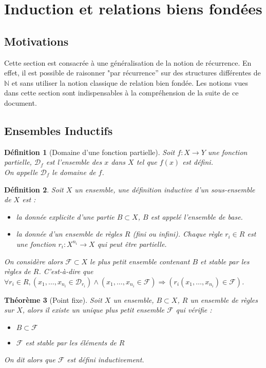 \documentclass[a4paper,12pt]{article}
\theoremstyle{plain}
\newtheorem{theo}{Théorème}[subsection]
\newtheorem{defi}[theo]{Définition}
\begin{document}
\section{Induction et relations biens fondées}
\label{induction et relations biens fondées}

\subsection{Motivations}

Cette section est consacrée à une généralisation de la notion de récurrence. En effet, il est possible de raisonner "par récurrence'' sur des structures différentes de $\mathbb{N}$ et sans utiliser la notion classique de relation bien fondée. Les notions vues dans cette section sont indispensables à la compréhension de la suite de ce document.

\subsection{Ensembles Inductifs}

\begin{defi}[Domaine d'une fonction partielle]
Soit $f : X \to Y$ une fonction partielle, $\mathcal{D}_f$ est l'ensemble des $x$ dans $X$ tel que $f(x)$ est défini.\\
On appelle $\mathcal{D}_f$ le domaine de $f$.
\end{defi}

\begin{defi}
Soit $X$ un ensemble, une définition inductive d'un sous-ensemble de $X$ est :
\begin{itemize}
\setlength\itemsep{ -1.5 em}
\item  la donnée explicite d'une partie $B \subset X$, $B$ est appelé l'ensemble de base.\\
\item  la donnée d'un ensemble de règles $R$ (fini ou infini). Chaque règle $r_i \in R$ est une fonction $r_i :  X^{n_i} \to X$ qui peut être partielle.
\end{itemize}
On considère alors $\mathcal{F} \subset X$ le plus petit ensemble contenant $B$ et stable par les règles de $R$. C'est-à-dire que $\forall r_i \in R, (x_1, \dots, x_{n_i} \in \mathcal{D}_{r_i} ) \land  (x_1, \dots, x_{n_i} \in \mathcal{F}) \Rightarrow(r_i( x_1, \dots, x_{n_i}) \in \mathcal{F})$.
\end{defi}

\begin{theo}[Point fixe]
Soit $X$ un ensemble, $B \subset X$, $R$ un ensemble de règles sur $X$, alors il existe un unique plus petit ensemble $\mathcal{F}$ qui vérifie :
\begin{itemize}
\setlength\itemsep{ -1.5 em}
\item[$(B)$] $B \subset \mathcal{F}$\\
\item[$(I)$] $\mathcal{F}$ est stable par les éléments de $R$ 
\end{itemize}
On dit alors que $\mathcal{F}$ est défini inductivement.
\end{theo}
\end{document}
